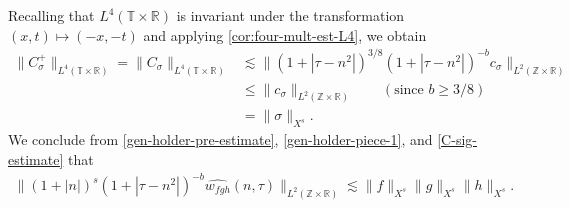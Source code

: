 \documentclass[12pt,reqno]{amsart}
\numberwithin{equation}{section}  %
\numberwithin{figure}{section}
\newcommand{\rr}{\mathbb{R}}
\newcommand{\zz}{\mathbb{Z}}
\newcommand{\ci}{\mathbb{T}}
\newcommand{\wh}{\widehat}
\theoremstyle{plain}
\theoremstyle{definition}
\theoremstyle{remark}
\begin{document}
%
%
Recalling that $L^4(\ci \times \rr)$ is invariant under the transformation $(x, 
t) \mapsto (-x,-t)$ and applying 
\autoref{cor:four-mult-est-L4}, we obtain
%
%
\begin{equation}
	\label{C-sig-estimate}
	\begin{split}
		\| C^+_\sigma \|_{L^4(\ci \times \rr)} = \|C_\sigma \|_{L^4(\ci \times \rr)} 
		& \lesssim \|\left( 1 + | \tau - n^2 | 
		\right)^{3/8} \left( 1 + | \tau - n^2 | 
		\right)^{-b} c_\sigma \|_{L^2(\zz \times \rr)}
		\\
		& 
		\le \|c_\sigma \|_{L^2(\zz \times \rr)}  \qquad (\text{since  } b \ge 3/8)
		\\
		& = \|\sigma\|_{X^s}.
	\end{split}
\end{equation}
%
%
We conclude from \eqref{gen-holder-pre-estimate}, \eqref{gen-holder-piece-1}, 
and \eqref{C-sig-estimate} that
%
%
%
%
\begin{equation*}
	\begin{split}
		\| \left( 1 + |n | \right)^s \left( 1 + | \tau - n^2 | \right)^{-b} \wh{w_{fgh}} 
		(n, \tau) \|_{L^2(\zz \times \rr)} \lesssim 
		\|f\|_{X^s}\|g\|_{X^s}\|h\|_{X^s}.
	\end{split}
\end{equation*}
%
%
%
\end{document}
